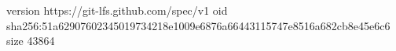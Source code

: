 version https://git-lfs.github.com/spec/v1
oid sha256:51a62907602345019734218e1009e6876a66443115747e8516a682cb8e45e6c6
size 43864
